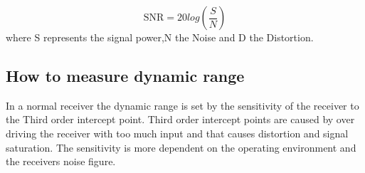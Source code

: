 \begin{equation}
\text{SNR} = 20log\left(\frac{S}{N}\right)
\end{equation}
where S represents the signal power,N the Noise and D the Distortion.\citep{SINADandSNR}




\subsection{How to measure dynamic range}

In a normal receiver the dynamic range is set by the sensitivity of the receiver to the Third order intercept point. Third order intercept points are caused by over driving the receiver with too much input and that causes distortion and signal saturation. The sensitivity is more dependent on the operating environment and the receivers noise figure. \citep{understandDynamic}


